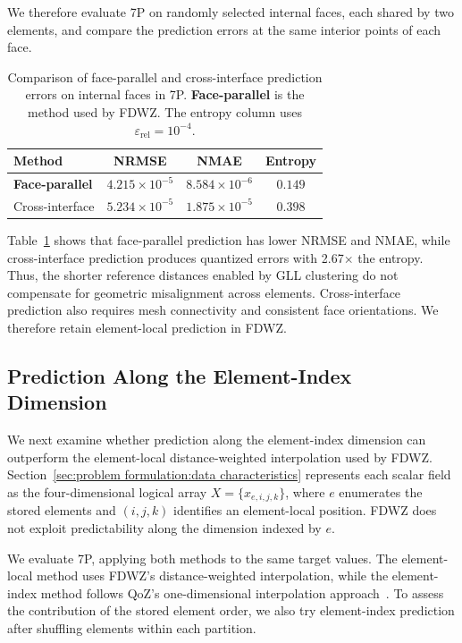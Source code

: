 We therefore evaluate 7P on randomly selected internal faces, each shared by two elements, and compare the prediction errors at the same interior points of each face.

\begin{table}[htb]
    \centering
    \caption{Comparison of face-parallel and cross-interface prediction errors on internal faces in 7P. \textbf{Face-parallel} is the method used by FDWZ. The entropy column uses $\varepsilon_{\mathrm{rel}}=10^{-4}$.}
    \label{tab:cross-interface-prediction}
    \footnotesize
    \setlength{\tabcolsep}{3pt}
    \begin{tabular*}{\columnwidth}{@{\extracolsep{\fill}}lccc@{}}
        \toprule
        Method & NRMSE & NMAE & Entropy \\
        \midrule
        \textbf{Face-parallel} & $4.215\times10^{-5}$ & $8.584\times10^{-6}$ & $0.149$ \\
        Cross-interface & $5.234\times10^{-5}$ & $1.875\times10^{-5}$ & $0.398$ \\
        \bottomrule
    \end{tabular*}
\end{table}

Table~\ref{tab:cross-interface-prediction} shows that face-parallel prediction has lower NRMSE and NMAE, while cross-interface prediction produces quantized errors with 2.67$\times$ the entropy. Thus, the shorter reference distances enabled by GLL clustering do not compensate for geometric misalignment across elements. Cross-interface prediction also requires mesh connectivity and consistent face orientations. We therefore retain element-local prediction in FDWZ.

\subsection{Prediction Along the Element-Index Dimension}\label{sec:FDWZ:element-index-dimension}\label{sec:SZ3-HOHS:element_dimension}

We next examine whether prediction along the element-index dimension can outperform the element-local distance-weighted interpolation used by FDWZ. Section~\ref{sec:problem formulation:data characteristics} represents each scalar field as the four-dimensional logical array $X=\{x_{e,i,j,k}\}$, where $e$ enumerates the stored elements and $(i,j,k)$ identifies an element-local position. FDWZ does not exploit predictability along the dimension indexed by $e$.

We evaluate 7P, applying both methods to the same target values. The element-local method uses FDWZ's distance-weighted interpolation, while the element-index method follows QoZ's one-dimensional interpolation approach~\cite{liu2024high}. To assess the contribution of the stored element order, we also try element-index prediction after shuffling elements within each partition.

